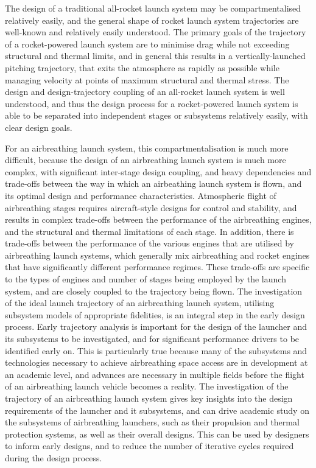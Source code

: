     The design of a traditional all-rocket launch system may be compartmentalised relatively easily, and the general shape of rocket launch system trajectories are well-known and relatively easily understood.  The primary goals of the trajectory of a rocket-powered launch system are to minimise drag while not exceeding structural and thermal limits, and in general this results in a vertically-launched pitching trajectory, that exits the atmosphere as rapidly as possible while managing velocity at points of maximum structural and thermal stress. The design and design-trajectory coupling of an all-rocket launch system is well understood, and thus the design process for a rocket-powered launch system is able to be separated into independent stages or subsystems relatively easily, with clear design goals. 
    
   
    
    For an airbreathing launch system, this compartmentalisation is much more difficult, because the design of an airbreathing launch system is much more complex, with significant inter-stage design coupling, and heavy dependencies and trade-offs between the way in which an airbeathing launch system is flown, and its optimal design and performance characteristics. Atmospheric flight of airbreathing stages requires aircraft-style designs for control and stability, and results in complex trade-offs between the performance of the airbreathing engines, and the structural and thermal limitations of each stage. In addition, there is trade-offs between the performance of the various engines that are utilised by airbreathing launch systems, which generally mix airbreathing and rocket engines that have significantly different performance regimes.
    These trade-offs are specific to the types of engines and number of stages being employed by the launch system, and are closely coupled to the trajectory being flown. The investigation of the ideal launch trajectory of an airbreathing launch system, utilising subsystem models of appropriate fidelities, is an integral step in the early design process. Early trajectory analysis is important for the design of the launcher and its subsystems to be investigated, and for significant performance drivers to be identified early on. 
  This is particularly true because many of the subsystems and technologies necessary to achieve airbreathing space access are in development at an academic level, and advances are necessary in multiple fields before the flight of an airbreathing launch vehicle becomes a reality. The investigation of the trajectory of an airbreathing launch system gives key insights into the design requirements of the launcher and it subsystems, and can drive academic study on the subsystems of airbreathing launchers, such as their propulsion and thermal protection systems, as well as their overall designs. This can be used by designers to inform early designs, and to reduce the number of iterative cycles required during the design process. 
    
  